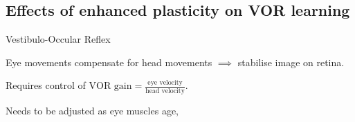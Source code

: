 \documentclass[final]{beamer}%
\begin{document}

\subsection{Effects of enhanced plasticity on VOR learning}


\begin{frame}{Vestibulo-Occular Reflex}
%
 \parbox[t]{0.35\linewidth}{}
 \parbox[t]{0.64\linewidth}{%
 Eye movements compensate for head movements $\implies$ stabilise image on retina.

 \vp Requires control of $\text{VOR gain} = \frac{\text{eye velocity}}{\text{head velocity}}$.

 \vp Needs to be adjusted as eye muscles age, \etc
 }

%
\end{frame}


\end{document}
